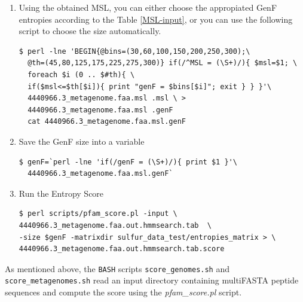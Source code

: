 \documentclass[12pt]{report}
\begin{document}
\begin{enumerate}
\begin{enumerate}
\item Using the obtained MSL, you can either choose the appropiated GenF entropies according to the Table \ref{MSL-input}, or you can use the following script to choose the size automatically. 

\begin{verbatim}
$ perl -lne 'BEGIN{@bins=(30,60,100,150,200,250,300);\
  @th=(45,80,125,175,225,275,300)} if(/^MSL = (\S+)/){ $msl=$1; \  
  foreach $i (0 .. $#th){ \ 
  if($msl<=$th[$i]){ print "genF = $bins[$i]"; exit } } }'\
  4440966.3_metagenome.faa.msl .msl \ >    
  4440966.3_metagenome.faa.msl .genF
  cat 4440966.3_metagenome.faa.msl.genF
\end{verbatim}

\item Save the GenF size into a variable  
  
  \begin{verbatim}
$ genF=`perl -lne 'if(/genF = (\S+)/){ print $1 }'\
  4440966.3_metagenome.faa.msl.genF`
  \end{verbatim}
    
\item Run the Entropy Score
    \begin{verbatim}
$ perl scripts/pfam_score.pl -input \ 
4440966.3_metagenome.faa.out.hmmsearch.tab  \
-size $genF -matrixdir sulfur_data_test/entropies_matrix > \
4440966.3_metagenome.faa.out.hmmsearch.tab.score
\end{verbatim}
\end{enumerate}
\end{enumerate}

As mentioned above, the \texttt{BASH} scripts \verb+score_genomes.sh+ and \verb+score_metagenomes.sh+  read an input directory containing multiFASTA peptide sequences and compute the score using the \textit{pfam\_score.pl} script.


\end{document}
